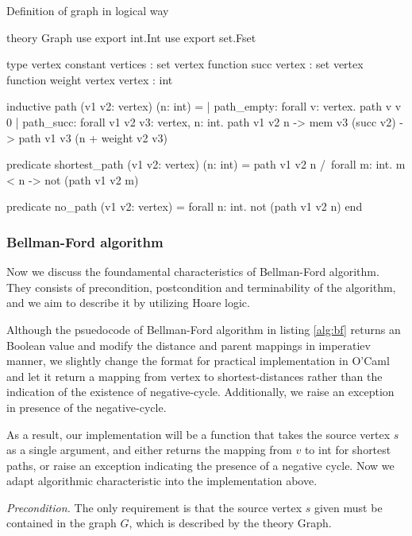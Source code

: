 \documentclass[a4paper,12pt]{article}
\begin{document}
\begin{algorithm}
\caption{Definition of graph in logical way}\label{lst:why_graph}
\begin{why3}[1]
theory Graph
  use export int.Int
  use export set.Fset

  type vertex
  constant vertices : set vertex
  function succ vertex : set vertex
  function weight vertex vertex : int

  inductive path (v1 v2: vertex) (n: int) =
    | path_empty:
        forall v: vertex. path v v 0
    | path_succ:
        forall v1 v2 v3: vertex, n: int.
        path v1 v2 n -> mem v3 (succ v2) -> path v1 v3 (n + weight v2 v3)

  predicate shortest_path (v1 v2: vertex) (n: int) =
    path v1 v2 n /\
    forall m: int. m < n -> not (path v1 v2 m)

  predicate no_path (v1 v2: vertex) =
    forall n: int. not (path v1 v2 n)
end
\end{why3}
\end{algorithm}

\subsubsection{Bellman-Ford algorithm}

Now we discuss the foundamental characteristics of Bellman-Ford algorithm. They consists of precondition, postcondition and terminability of the algorithm, and we aim to describe it by utilizing Hoare logic.

Although the psuedocode of Bellman-Ford algorithm in listing \ref{alg:bf} returns an Boolean value and modify the distance and parent mappings in imperatiev manner, we slightly change the format for practical implementation in O'Caml and let it return a mapping from vertex to shortest-distances rather than the indication of the existence of negative-cycle. Additionally, we raise an exception in presence of the negative-cycle.

As a result, our implementation will be a function that takes the source vertex $ s $ as a single argument, and either returns the mapping from $ v $ to \mbox{\sc int} for shortest paths, or raise an exception indicating the presence of a negative cycle. Now we adapt algorithmic characteristic into the implementation above.

\emph{Precondition.} The only requirement is that the source vertex $ s $ given must be contained in the graph $ G $, which is described by the theory \mbox{\sc Graph}.
\end{document}
